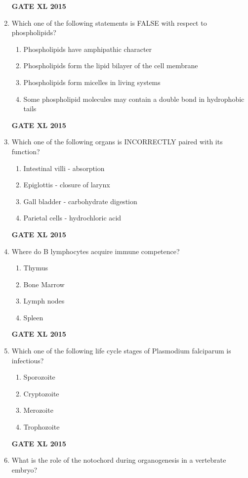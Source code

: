 \documentclass[journal,12pt,onecolumn]{IEEEtran}
\begin{document}
\begin{enumerate}
\hfill{\textbf{GATE XL 2015}}
\item Which one of the following statements is FALSE with respect to phospholipids?
    \begin{enumerate}
            \item  Phospholipids have amphipathic character
	    \item  Phospholipids form the lipid bilayer of the cell membrane
	    \item Phospholipids form micelles in living systems
            \item Some phospholipid molecules may contain a double bond in hydrophobic tails
    \end{enumerate}
\hfill{\textbf{GATE XL 2015}}
\item Which one of the following organs is INCORRECTLY paired with its function?
    \begin{enumerate}
            \item  Intestinal villi - absorption
	    \item Epiglottis - closure of larynx
	    \item Gall bladder - carbohydrate digestion
            \item Parietal cells - hydrochloric acid
    \end{enumerate}
\hfill{\textbf{GATE XL 2015}}
\item Where do B lymphocytes acquire immune competence?
    \begin{enumerate}
            \item Thymus 
	    \item Bone Marrow
	    \item Lymph nodes
            \item Spleen
    \end{enumerate}
\hfill{\textbf{GATE XL 2015}}
\item Which one of the following life cycle stages of Plasmodium falciparum is infectious?
    \begin{enumerate}
            \item Sporozoite
	    \item Cryptozoite
	    \item Merozoite
            \item Trophozoite
    \end{enumerate}
\hfill{\textbf{GATE XL 2015}}
\item What is the role of the notochord during organogenesis in a vertebrate embryo?
    \begin{enumerate}

\end{enumerate}
\end{enumerate}
\end{document}
